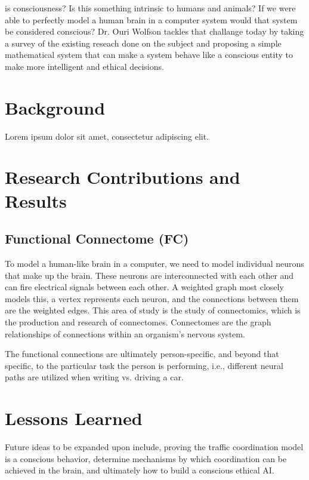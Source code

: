 \documentclass[journal,onecolumn]{IEEEtran}
\begin{document}
 is consciousness? Is this something intrinsic to humans and animals? If we were able to perfectly model a human brain in a computer system would that system be considered conscious? Dr. Ouri Wolfson tackles that challange today by taking a survey of the existing reseach done on the subject and proposing a simple mathematical system that can make a system behave like a conscious entity to make more intelligent and ethical decisions. 



\section{Background}

Lorem ipsum dolor sit amet, consectetur adipiscing elit.

\section{Research Contributions and Results}

\subsection{Functional Connectome (FC)}

To model a human-like brain in a computer, we need to model individual neurons that make up the brain. These neurons are interconnected with each other and can fire electrical signals between each other. A weighted graph most closely models this, a vertex represents each neuron, and the connections between them are the weighted edges. This area of study is the study of connectomics, which is the production and research of connectomes. Connectomes are the graph relationships of connections within an organism's nervous system.

The functional connections are ultimately person-specific, and beyond that specific, to the particular task the person is performing, i.e., different neural paths are utilized when writing vs. driving a car. 

\section{Lessons Learned}

Future ideas to be expanded upon include, proving the traffic coordination model is a conscious behavior, determine mechanisms by which coordination can be achieved in the brain, and ultimately how to build a conscious ethical AI. 
\end{document}
